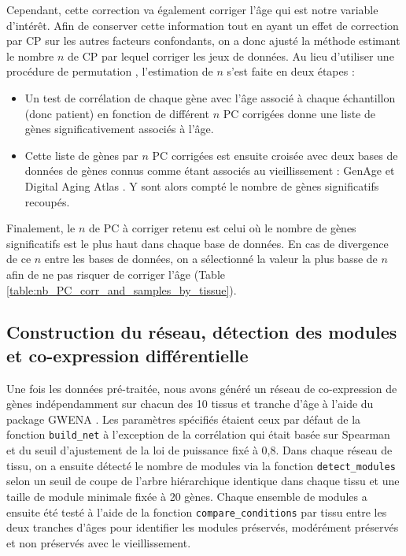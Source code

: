 Cependant, cette correction va également corriger l'âge qui est notre variable d'intérêt. Afin de conserver cette information tout en ayant un effet de correction par CP sur les autres facteurs confondants, on a donc ajusté la méthode estimant le nombre $n$ de CP par lequel corriger les jeux de données. Au lieu d'utiliser une procédure de permutation , l'estimation de $n$ s'est faite en deux étapes :
\begin{itemize}
    \item Un test de corrélation de chaque gène avec l'âge associé à chaque échantillon (donc patient) en fonction de différent $n$ PC corrigées donne une liste de gènes significativement associés à l'âge.
    \item Cette liste de gènes par $n$ PC corrigées est ensuite croisée avec deux bases de données de gènes connus comme étant associés au vieillissement : GenAge  et Digital Aging Atlas . Y sont alors compté le nombre de gènes significatifs recoupés.
\end{itemize}
Finalement, le $n$ de PC à corriger retenu est celui où le nombre de gènes significatifs est le plus haut dans chaque base de données. En cas de divergence de ce $n$ entre les bases de données, on a sélectionné la valeur la plus basse de $n$ afin de ne pas risquer de corriger l'âge (Table \ref{table:nb_PC_corr_and_samples_by_tissue}).




\subsection{Construction du réseau, détection des modules et co-expression différentielle}

Une fois les données pré-traitée, nous avons généré un réseau de co-expression de gènes indépendamment sur chacun des 10 tissus et tranche d'âge à l'aide du package GWENA . Les paramètres spécifiés étaient ceux par défaut de la fonction \verb+build_net+ à l'exception de la corrélation qui était basée sur Spearman et du seuil d'ajustement de la loi de puissance fixé à 0,8. Dans chaque réseau de tissu, on a ensuite détecté le nombre de modules via la fonction \verb+detect_modules+ selon un seuil de coupe de l'arbre hiérarchique identique dans chaque tissu et une taille de module minimale fixée à 20 gènes. Chaque ensemble de modules a ensuite été testé à l'aide de la fonction \verb+compare_conditions+ par tissu entre les deux tranches d'âges pour identifier les modules préservés, modérément préservés et non préservés avec le vieillissement.

